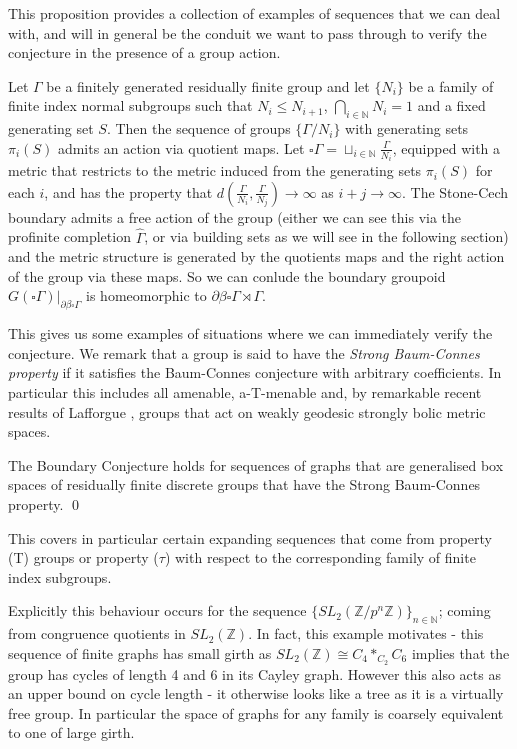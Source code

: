 This proposition provides a collection of examples of sequences that we can deal with, and will in general be the conduit we want to pass through to verify the conjecture in the presence of a group action.

\begin{example}
Let $\Gamma$ be a finitely generated residually finite group and let $\lbrace N_{i}\rbrace$ be a family of finite index normal subgroups such that $N_{i}\leq N_{i+1}$, $\bigcap_{i \in \mathbb{N}}N_{i}=1$ and a fixed generating set $S$. Then the sequence of groups $\lbrace \Gamma/N_{i}\rbrace$ with generating sets $\pi_{i}(S)$ admits an action via quotient maps. Let $\square\Gamma= \sqcup_{i \in \mathbb{N}}\frac{\Gamma}{N_{i}}$, equipped with a metric that restricts to the metric induced from the generating sets $\pi_{i}(S)$ for each $i$, and has the property that $d(\frac{\Gamma}{N_{i}},\frac{\Gamma}{N_{j}})\rightarrow \infty$ as $i+j \rightarrow \infty$. The Stone-Cech boundary admits a free action of the group (either we can see this via the profinite completion $\widehat{\Gamma}$, or via building sets as we will see in the following section) and the metric structure is generated by the quotients maps and the right action of the group via these maps. So we can conlude the boundary groupoid $G(\square\Gamma)|_{\partial \beta \square \Gamma}$ is homeomorphic to $\partial\beta\square\Gamma \rtimes \Gamma$.  
\end{example}

This gives us some examples of situations where we can immediately verify the conjecture. We remark that a group is said to have the \textit{Strong Baum-Connes property} if it satisfies the Baum-Connes conjecture with arbitrary coefficients. In particular this includes all amenable, a-T-menable \cite{MR1487204} and, by remarkable recent results of Lafforgue \cite{lafforgue2012}, groups that act on weakly geodesic strongly bolic metric spaces.

\begin{theorem}
The Boundary Conjecture holds for sequences of graphs that are generalised box spaces of residually finite discrete groups that have the Strong Baum-Connes property. \qed
\end{theorem}

This covers in particular certain expanding sequences that come from property (T) groups or property ($\tau$) with respect to the corresponding family of finite index subgroups. 

Explicitly this behaviour occurs for the sequence $\lbrace SL_{2}(\mathbb{Z}/p^{n}\mathbb{Z})\rbrace_{n\in\mathbb{N}}$; coming from congruence quotients in $SL_{2}(\mathbb{Z})$. In fact, this example motivates \cite{MR2568691} - this sequence of finite graphs has small girth as $SL_{2}(\mathbb{Z}) \cong C_{4}\ast_{C_{2}}C_{6}$ implies that the group has cycles of length 4 and 6 in its Cayley graph. However this also acts as an upper bound on cycle length - it otherwise looks like a tree as it is a virtually free group. In particular the space of graphs for any family is coarsely equivalent to one of large girth. 

